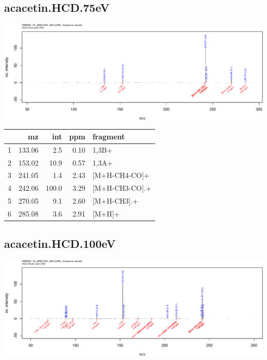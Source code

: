 \documentclass[]{article}
\begin{document}
\clearpage\subsection{acacetin.HCD.75eV}
\includegraphics[width=\textwidth]{WEB350_files/figure-latex/unnamed-chunk-3-38}

\begin{table}[ht]
\centering
\begin{tabular}{rrrrl}
  \toprule
 & mz & int & ppm & fragment \\ 
  \midrule
1 & 133.06 & 2.5 & 0.10 & 1,3B+ \\ 
  2 & 153.02 & 10.9 & 0.57 & 1,3A+ \\ 
  3 & 241.05 & 1.4 & 2.43 & [M+H-CH4-CO]+ \\ 
  4 & 242.06 & 100.0 & 3.29 & [M+H-CH3-CO].+ \\ 
  5 & 270.05 & 9.1 & 2.60 & [M+H-CH3].+ \\ 
  6 & 285.08 & 3.6 & 2.91 & [M+H]+ \\ 
   \bottomrule
\end{tabular}
\end{table}

\clearpage\subsection{acacetin.HCD.100eV}
\includegraphics[width=\textwidth]{WEB350_files/figure-latex/unnamed-chunk-3-39}
\end{document}
